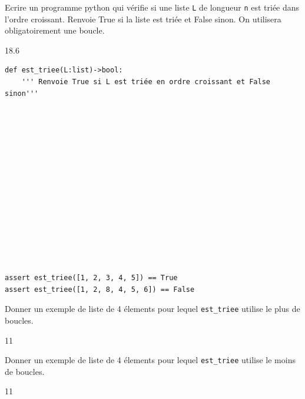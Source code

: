 \documentclass[a4paper,10pt]{report}
\begin{document}
\begin{enumerate}
    \item Ecrire un programme python qui vérifie si une liste \verb|L| de longueur \verb|n| est triée dans l'ordre croissant. Renvoie True si la liste est triée et False sinon.
    On utilisera obligatoirement une boucle. 
    \begin{answer}{1}{8.6}
        \begin{verbatim}
def est_triee(L:list)->bool:
    ''' Renvoie True si L est triée en ordre croissant et False sinon'''
    
    
               
    

    


          
    



    
    
assert est_triee([1, 2, 3, 4, 5]) == True
assert est_triee([1, 2, 8, 4, 5, 6]) == False

        \end{verbatim}
        \end{answer}

        \begin{minipage}{0.49\linewidth}
            \item Donner un exemple de liste de 4 élements pour lequel \verb|est_triee| utilise le plus de boucles.

    \end{minipage}\hfill
    \begin{minipage}{0.49\linewidth}
            \begin{answer}{1}{1}    \end{answer}

    \end{minipage}

    \begin{minipage}{0.49\linewidth}
        \item Donner un exemple de liste de 4 élements pour lequel \verb|est_triee| utilise le moins de boucles.

\end{minipage}\hfill
\begin{minipage}{0.49\linewidth}
        \begin{answer}{1}{1}    \end{answer}

\end{minipage}

\end{enumerate}
\end{document}
